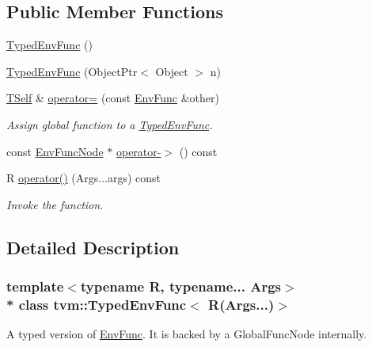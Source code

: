 \subsection*{Public Member Functions}
\begin{DoxyCompactItemize}
\item 
\hyperlink{classtvm_1_1TypedEnvFunc_3_01R_07Args_8_8_8_08_4_a41a6b9014d0feeb628ca7edfd0d26f0b}{Typed\+Env\+Func} ()
\item 
\hyperlink{classtvm_1_1TypedEnvFunc_3_01R_07Args_8_8_8_08_4_a0d72a6fa7263821c14bcd37837998ed9}{Typed\+Env\+Func} (Object\+Ptr$<$ Object $>$ n)
\item 
\hyperlink{classtvm_1_1TypedEnvFunc_3_01R_07Args_8_8_8_08_4_a29adf4db79c99318db779a71f26acc0f}{T\+Self} \& \hyperlink{classtvm_1_1TypedEnvFunc_3_01R_07Args_8_8_8_08_4_aab332907b9f98876f441f6403b801187}{operator=} (const \hyperlink{classtvm_1_1EnvFunc}{Env\+Func} \&other)
\begin{DoxyCompactList}\small\item\em Assign global function to a \hyperlink{classtvm_1_1TypedEnvFunc}{Typed\+Env\+Func}. \end{DoxyCompactList}\item 
const \hyperlink{classtvm_1_1EnvFuncNode}{Env\+Func\+Node} $\ast$ \hyperlink{classtvm_1_1TypedEnvFunc_3_01R_07Args_8_8_8_08_4_a5d9623ecced817c2d56deddfdc2f761b}{operator-\/$>$} () const 
\item 
R \hyperlink{classtvm_1_1TypedEnvFunc_3_01R_07Args_8_8_8_08_4_a2c756d14682b41d9b733673443b782f1}{operator()} (Args...\+args) const 
\begin{DoxyCompactList}\small\item\em Invoke the function. \end{DoxyCompactList}\end{DoxyCompactItemize}


\subsection{Detailed Description}
\subsubsection*{template$<$typename R, typename... Args$>$\\*
class tvm\+::\+Typed\+Env\+Func$<$ R(\+Args...)$>$}

A typed version of \hyperlink{classtvm_1_1EnvFunc}{Env\+Func}. It is backed by a Global\+Func\+Node internally. 

